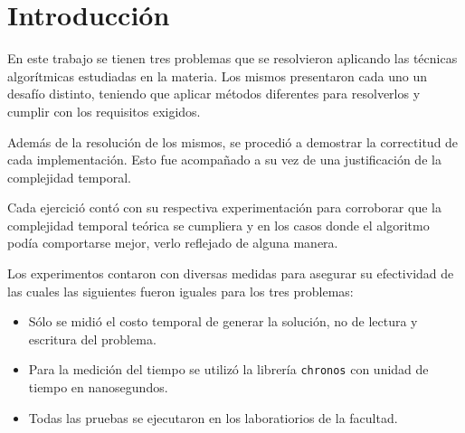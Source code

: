\section{Introducción}

En este trabajo se tienen tres problemas que se resolvieron aplicando las
técnicas algorítmicas estudiadas en la materia. Los mismos presentaron cada uno un desafío
distinto, teniendo que aplicar métodos diferentes para resolverlos y cumplir
con los requisitos exigidos.

Además de la resolución de los mismos, se procedió a demostrar la correctitud de
cada implementación. Esto fue acompañado a su vez de una justificación de la
complejidad temporal.

Cada ejercició contó con su respectiva experimentación para corroborar que la
complejidad temporal teórica se cumpliera y en los casos donde el algoritmo
podía comportarse mejor, verlo reflejado de alguna manera.

Los experimentos contaron con diversas medidas para asegurar su efectividad de
las cuales las siguientes fueron iguales para los tres problemas:
\begin{itemize}
	\item{Sólo se midió el costo temporal de generar la solución, no
			de lectura y escritura del problema.}
	\item{Para la medición del tiempo se utilizó la librería \texttt{chronos}
			con unidad de tiempo en nanosegundos.}
	\item{Todas las pruebas se ejecutaron en los laboratiorios de la facultad.}
\end{itemize}
